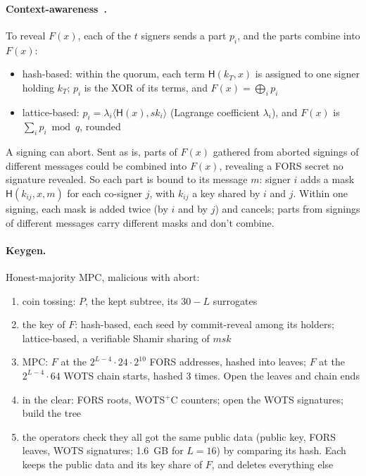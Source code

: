 \documentclass[11pt]{article}
\newcommand{\hash}{\mathsf{H}}
\begin{document}
\paragraph{Context-awareness~\cite{PRAWNS}.} To reveal $F(x)$, each of the $t$ signers sends a part $p_i$,
and the parts combine into $F(x)$:
\begin{itemize}
  \item hash-based: within the quorum, each term $\hash(k_T,x)$ is assigned to one signer holding $k_T$; $p_i$ is
        the XOR of its terms, and $F(x)=\bigoplus_i p_i$
  \item lattice-based: $p_i=\lambda_i\langle\hash(x),\mathit{sk}_i\rangle$ (Lagrange coefficient $\lambda_i$), and
        $F(x)$ is $\sum_i p_i \bmod q$, rounded
\end{itemize}
A signing can abort. Sent as is, parts of $F(x)$ gathered from aborted signings of different messages
could be combined into $F(x)$, revealing a FORS secret no signature revealed. So each part is bound to its
message $m$: signer $i$ adds a mask $\hash(k_{ij},x,m)$ for each co-signer $j$, with $k_{ij}$ a key shared by
$i$ and $j$. Within one signing, each mask is added twice (by $i$ and by $j$) and cancels; parts from
signings of different messages carry different masks and don't combine.

\paragraph{Keygen.} Honest-majority MPC, malicious with abort:
\begin{enumerate}
  \item coin tossing: $P$, the kept subtree, its $30-L$ surrogates
  \item the key of $F$: hash-based, each seed by commit-reveal among its holders; lattice-based, a
        verifiable Shamir sharing of $\mathit{msk}$
  \item MPC: $F$ at the $2^{L-4}\cdot24\cdot2^{10}$ FORS addresses, hashed into leaves; $F$ at the
        $2^{L-4}\cdot64$ WOTS chain starts, hashed 3 times. Open the leaves and chain ends
  \item in the clear: FORS roots, WOTS$^+$C counters; open the WOTS signatures; build the tree
  \item the operators check they all got the same public data (public key, FORS leaves, WOTS signatures;
        1.6~GB for $L=16$) by comparing its hash. Each keeps the public data and its key share of $F$, and
        deletes everything else
\end{enumerate}
\end{document}
